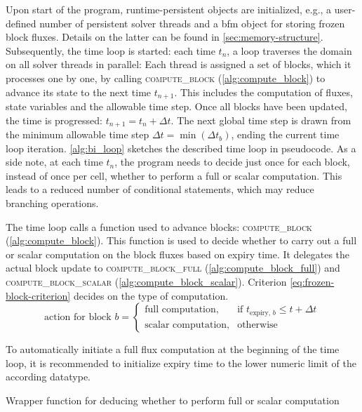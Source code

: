 Upon start of the program, runtime-persistent objects are initialized, e.g., a user-defined number of persistent solver threads and a \gls{bfm} object for storing frozen block fluxes.
Details on the latter can be found in \autoref{sec:memory-structure}.
Subsequently, the time loop is started: each %
time $t_n$, a loop traverses the domain on all solver threads in parallel: 
Each thread is assigned a set of blocks, which it processes one by one, by calling \textsc{compute\_block} (\autoref{alg:compute_block}) to advance its state to the next time $t_{n+1}$.
This includes the computation of fluxes, state variables and the allowable time step.
Once all blocks have been updated, the time is progressed: $t_{n+1} = t_{n} + \Delta t$. 
The next global time step is drawn from the minimum allowable time step $\Delta t = \min (\Delta t_b)$, ending the current time loop iteration.
\autoref{alg:bi_loop} sketches the described time loop in pseudocode.
\label{fix:conditional-statments}As a side note, at each time $t_n$, the program needs to decide just once for each block, instead of once per cell, whether to perform a full or scalar computation.
This leads to a reduced number of conditional statements,  which may reduce branching operations.

The time loop calls a function used to advance blocks: \textsc{compute\_block} (\autoref{alg:compute_block}).
This function is used to decide whether to carry out a full or scalar computation on the block fluxes based on expiry time. 
It delegates the actual block update to \textsc{compute\_block\_full} (\autoref{alg:compute_block_full}) and \textsc{compute\_block\_scalar} (\autoref{alg:compute_block_scalar}).
Criterion \ref{eq:frozen-block-criterion} decides on the type of computation.
\begin{equation}
  \label{eq:frozen-block-criterion}
  \text{action for block } b = 
  \left\{
    \begin{array}{ll}
      \text{full computation}, & \text{if } t_{\text{expiry}, \, b} \leq t + \Delta t \\
      \text{scalar computation}, & \text{otherwise}
    \end{array}
  \right.
\end{equation}

To automatically initiate a full flux computation at the beginning of the time loop, it is recommended to initialize expiry time to the lower numeric limit of the according datatype.

\begin{algorithm} [htb]
  \caption{Wrapper function for deducing whether to perform full or scalar computation}
  \label{alg:compute_block}
  \begin{algorithmic}[1]
    \small

      \State {}
      \Else
      \State {}
      \EndIf
    \EndFunction
  \end{algorithmic}
\end{algorithm}

